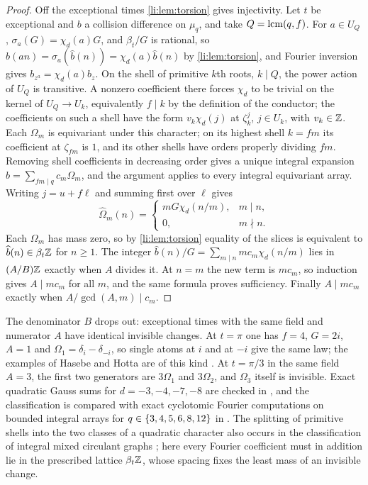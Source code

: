 \begin{proof}
Off the exceptional times \cref{li:lem:torsion} gives injectivity. Let $t$ be exceptional and $b$ a collision
difference on $\mu_q$, and take $Q=\operatorname{lcm}(q,f)$. For $a\in U_Q$, $\sigma_a(G)=\chi_d(a)G$, and $\beta_t/G$ is rational, so
$\widehat b(an)=\sigma_a(\widehat b(n))=\chi_d(a)\widehat b(n)$ by \cref{li:lem:torsion}, and Fourier inversion gives
$b_{z^a}=\chi_d(a)b_z$. On the shell of primitive $k$th roots, $k\mid Q$, the power action of $U_Q$ is transitive. A
nonzero coefficient there forces $\chi_d$ to be trivial on the kernel of $U_Q\to U_k$, equivalently $f\mid k$ by the
definition of the conductor; the coefficients on such a shell have the form $v_k\chi_d(j)$ at $\zeta_k^j$, $j\in U_k$, with
$v_k\in\mathbb{Z}$. Each $\Omega_m$ is equivariant under this character; on its highest shell $k=fm$ its coefficient at $\zeta_{fm}$
is $1$, and its other shells have orders properly dividing $fm$. Removing shell coefficients in decreasing order
gives a unique integral expansion $b=\sum_{fm\mid q}c_m\Omega_m$, and the argument applies to every integral
equivariant array. Writing $j=u+f\ell$ and summing first over $\ell$ gives
\begin{equation}\label{li:eq:DFT}
 \widehat\Omega_m(n)=\begin{cases}mG\chi_d(n/m),&m\mid n,\\0,&m\nmid n.\end{cases}
\end{equation}
Each $\Omega_m$ has mass zero, so by \cref{li:lem:torsion} equality of the slices is equivalent to $\widehat b(n)\in\beta_t\mathbb{Z}$
for $n\ge1$. The integer $\widehat b(n)/G=\sum_{m\mid n}mc_m\chi_d(n/m)$ lies in $(A/B)\mathbb{Z}$ exactly when $A$ divides it. At
$n=m$ the new term is $mc_m$, so induction gives $A\mid mc_m$ for all $m$, and the same formula proves
sufficiency. Finally $A\mid mc_m$ exactly when $A/\gcd(A,m)\mid c_m$.
\end{proof}

The denominator $B$ drops out: exceptional times with the same field and numerator $A$ have identical
invisible changes. At $t=\pi$ one has $f=4$, $G=2i$, $A=1$ and $\Omega_1=\delta_i-\delta_{-i}$, so single atoms at $i$ and at $-i$
give the same law; the examples of Hasebe and Hotta are of this kind \cite{HasebeHotta2022Additive}. At $t=\pi/3$ in
the same field $A=3$, the first two generators are $3\Omega_1$ and $3\Omega_2$, and $\Omega_3$ itself is invisible. Exact
quadratic Gauss sums for $d=-3,-4,-7,-8$ are checked in , and the
classification is compared with exact cyclotomic Fourier computations on bounded integral arrays for
$q\in\{3,4,5,6,8,12\}$ in
. The splitting of primitive shells into the two classes of a
quadratic character also occurs in the classification of integral mixed circulant graphs
\cite{KadyanBhattacharjya2023Integral}; here every Fourier coefficient must in addition lie in the prescribed lattice
$\beta_t\mathbb{Z}$, whose spacing fixes the least mass of an invisible change.

